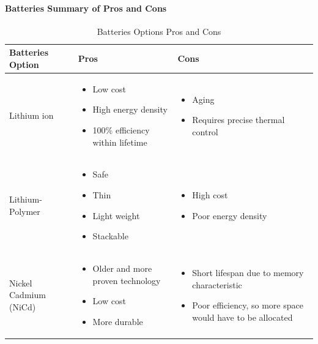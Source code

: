 \paragraph{Batteries Summary of Pros and Cons}
\begin{table}[H]
\centering
\begin{tabular}{|p{}|p{}|p{}|} 
\hline
\textbf{Batteries Option} & \textbf{Pros} & \textbf{Cons}
\\
\hline
     Lithium ion
     &
    \begin{itemize}
        \item Low cost
        \item High energy density
        \item 100\% efficiency within lifetime
    \end{itemize}
    &
    \begin{itemize}
        \item Aging
        \item Requires precise thermal control
    \end{itemize}
    \\
\hline
     Lithium-Polymer
     &
    \begin{itemize}
        \item Safe
        \item Thin
        \item Light weight
        \item Stackable
    \end{itemize}
    &
    \begin{itemize}
        \item High cost
        \item Poor energy density
    \end{itemize}
    \\
\hline
    Nickel Cadmium (NiCd)
    &
    \begin{itemize}
        \item Older and more proven technology
        \item Low cost
        \item More durable
    \end{itemize}
    &
    \begin{itemize}
        \item Short lifespan due to memory characteristic
        \item Poor efficiency, so more space would have to be allocated
    \end{itemize}
    \\
\hline
\end{tabular}
\caption{Batteries Options Pros and Cons}
\label{tbl:Batteries_ProCon}
\end{table}
